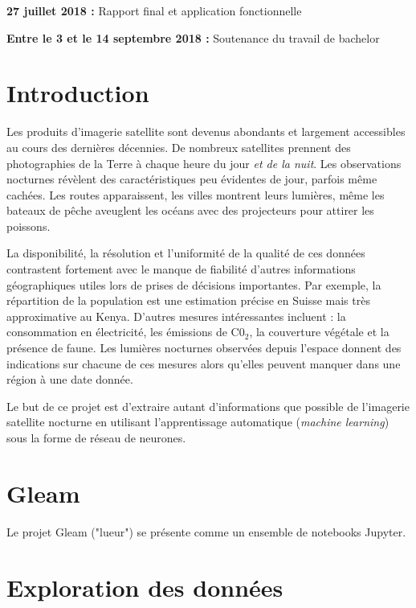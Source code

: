\documentclass[a4paper, 11pt]{report}
\begin{document}
\textbf{27 juillet 2018 :} Rapport final et application fonctionnelle

\textbf{Entre le 3 et le 14 septembre 2018 :} Soutenance du travail de bachelor



\chapter{Introduction}
Les produits d'imagerie satellite sont devenus abondants et largement accessibles au cours des dernières décennies. De nombreux satellites prennent des photographies de la Terre à chaque heure du jour \textit{et de la nuit}. Les observations nocturnes révèlent des caractéristiques peu évidentes de jour, parfois même cachées. Les routes apparaissent, les villes montrent leurs lumières, même les bateaux de pêche aveuglent les océans avec des projecteurs pour attirer les poissons.

La disponibilité, la résolution et l'uniformité de la qualité de ces données contrastent fortement avec le manque de fiabilité d'autres informations géographiques utiles lors de prises de décisions importantes. Par exemple, la répartition de la population est une estimation précise en Suisse mais très approximative au Kenya. D'autres mesures intéressantes incluent : la consommation en électricité, les émissions de C0$_2$, la couverture végétale et la présence de faune. Les lumières nocturnes observées depuis l'espace donnent des indications sur chacune de ces mesures alors qu'elles peuvent manquer dans une région à une date donnée.

Le but de ce projet est d'extraire autant d'informations que possible de l'imagerie satellite nocturne en utilisant l'apprentissage automatique (\textit{machine learning}) sous la forme de réseau de neurones.

\chapter{Gleam}

Le projet Gleam ("lueur") se présente comme un ensemble de notebooks Jupyter.

\chapter{Exploration des données}
\end{document}
